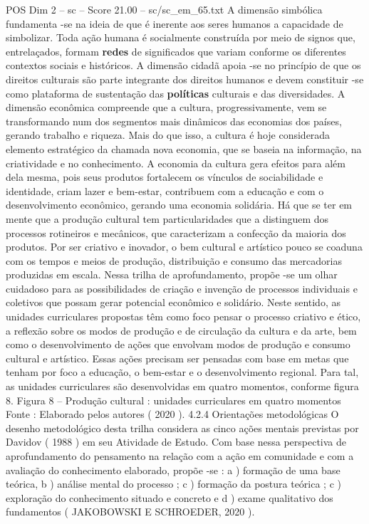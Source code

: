 \begin{textsample}{POS Dim 2 – sc – Score 21.00 – sc/sc\_em\_65.txt}
A dimensão simbólica fundamenta -se na ideia de que é inerente aos seres humanos a capacidade de simbolizar.
Toda ação humana é socialmente construída por meio de signos que, entrelaçados, formam \textbf{redes} de significados que variam conforme os diferentes contextos sociais e históricos.
A dimensão cidadã apoia -se no princípio de que os direitos culturais são parte integrante dos direitos humanos e devem constituir -se como plataforma de sustentação das \textbf{políticas} culturais e das diversidades.
A dimensão econômica compreende que a cultura, progressivamente, vem se transformando num dos segmentos mais dinâmicos das economias dos países, gerando trabalho e riqueza.
Mais do que isso, a cultura é hoje considerada elemento estratégico da chamada nova economia, que se baseia na informação, na criatividade e no conhecimento.
A economia da cultura gera efeitos para além dela mesma, pois seus produtos fortalecem os vínculos de sociabilidade e identidade, criam lazer e bem-estar, contribuem com a educação e com o desenvolvimento econômico, gerando uma economia solidária.
Há que se ter em mente que a produção cultural tem particularidades que a distinguem dos processos rotineiros e mecânicos, que caracterizam a confecção da maioria dos produtos.
Por ser criativo e inovador, o bem cultural e artístico pouco se coaduna com os tempos e meios de produção, distribuição e consumo das mercadorias produzidas em escala.
Nessa trilha de aprofundamento, propõe -se um olhar cuidadoso para as possibilidades de criação e invenção de processos individuais e coletivos que possam gerar potencial econômico e solidário.
Neste sentido, as unidades curriculares propostas têm como foco pensar o processo criativo e ético, a reflexão sobre os modos de produção e de circulação da cultura e da arte, bem como o desenvolvimento de ações que envolvam modos de produção e consumo cultural e artístico.
Essas ações precisam ser pensadas com base em metas que tenham por foco a educação, o bem-estar e o desenvolvimento regional.
Para tal, as unidades curriculares são desenvolvidas em quatro momentos, conforme figura 8.
Figura 8 – Produção cultural : unidades curriculares em quatro momentos Fonte : Elaborado pelos autores ( 2020 ). 4.2.4 Orientações metodológicas O desenho metodológico desta trilha considera as cinco ações mentais previstas por Davidov ( 1988 ) em seu Atividade de Estudo.
Com base nessa perspectiva de aprofundamento do pensamento na relação com a ação em comunidade e com a avaliação do conhecimento elaborado, propõe -se : a ) formação de uma base teórica, b ) análise mental do processo ; c ) formação da postura teórica ; c ) exploração do conhecimento situado e concreto e d ) exame qualitativo dos fundamentos ( JAKOBOWSKI E SCHROEDER, 2020 ).

\end{textsample}
